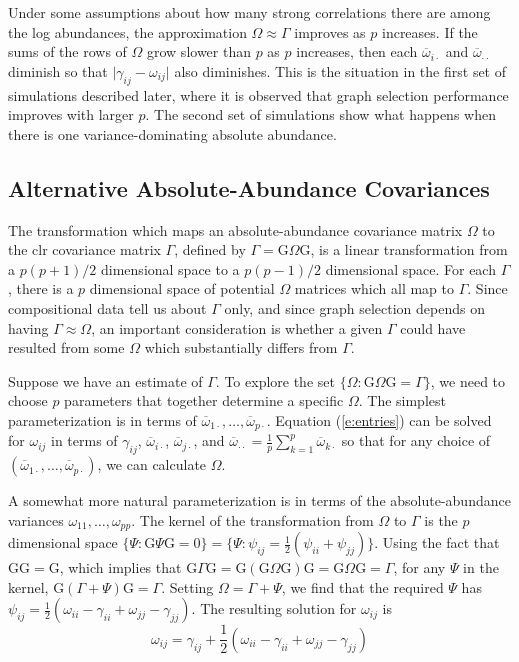 \documentclass[12pt]{article}
\begin{document}
Under some assumptions about how many strong correlations there are among the log abundances, the approximation $\Omega \approx \Gamma$ improves as $p$ increases. If the sums of the rows of $\Omega$ grow slower than $p$ as $p$ increases, then each $\overline{\omega}_{i\cdot}$ and $\overline{\omega}_{\cdot\cdot}$ diminish so that $\vert \gamma_{ij} - \omega_{ij} \rvert$ also diminishes. This is the situation in the first set of simulations described later, where it is observed that graph selection performance improves with larger $p$. The second set of simulations show what happens when there is one variance-dominating absolute abundance.

\subsection*{Alternative Absolute-Abundance Covariances}

The transformation which maps an absolute-abundance covariance matrix $\Omega$ to the clr covariance matrix $\Gamma$, defined by $\Gamma = \mathrm{G} \Omega \mathrm{G}$, is a linear transformation from a $p(p+1)/2$ dimensional space to a $p(p-1)/2$ dimensional space. For each $\Gamma$, there is a $p$ dimensional space of potential $\Omega$ matrices which all map to $\Gamma$. Since compositional data tell us about $\Gamma$ only, and since graph selection depends on having $\Gamma \approx \Omega$, an important consideration is whether a given $\Gamma$ could have resulted from some $\Omega$ which substantially differs from $\Gamma$.

Suppose we have an estimate of $\Gamma$. To explore the set $\{\Omega: \mathrm{G} \Omega \mathrm{G} = \Gamma\}$, we need to choose $p$ parameters that together determine a specific $\Omega$. The simplest parameterization is in terms of $\overline{\omega}_{1\cdot}, \dots, \overline{\omega}_{p\cdot}$. Equation (\ref{e:entries}) can be solved for $\omega_{ij}$ in terms of $\gamma_{ij}$, $\overline{\omega}_{i\cdot}$, $\overline{\omega}_{j\cdot}$, and $\overline{\omega}_{\cdot\cdot} = \frac{1}{p}\sum_{k=1}^p \overline{\omega}_{k\cdot}$ so that for any choice of $(\overline{\omega}_{1\cdot}, \dots, \overline{\omega}_{p\cdot})$, we can calculate $\Omega$.

A somewhat more natural parameterization is in terms of the absolute-abundance variances $\omega_{11}, \dots, \omega_{pp}$. The kernel of the transformation from $\Omega$ to $\Gamma$ is the $p$ dimensional space $\{ \Psi: \mathrm{G} \Psi \mathrm{G} = 0 \} = \{ \Psi: \psi_{ij} = \frac{1}{2}(\psi_{ii} + \psi_{jj})\}$. Using the fact that $\mathrm{G}\mathrm{G} = \mathrm{G}$, which implies that $\mathrm{G} \Gamma \mathrm{G} = \mathrm{G} (\mathrm{G} \Omega \mathrm{G}) \mathrm{G} = \mathrm{G} \Omega \mathrm{G} = \Gamma$, for any $\Psi$ in the kernel, $\mathrm{G} (\Gamma + \Psi) \mathrm{G} = \Gamma$. Setting $\Omega = \Gamma + \Psi$, we find that the required $\Psi$ has $\psi_{ij} = \frac{1}{2}(\omega_{ii} - \gamma_{ii} + \omega_{jj} - \gamma_{jj})$. The resulting solution for $\omega_{ij}$ is
\begin{equation}
\label{e:omegaentry}
\omega_{ij} = \gamma_{ij} + \frac{1}{2}(\omega_{ii} - \gamma_{ii} + \omega_{jj} - \gamma_{jj})
\end{equation}
\end{document}
